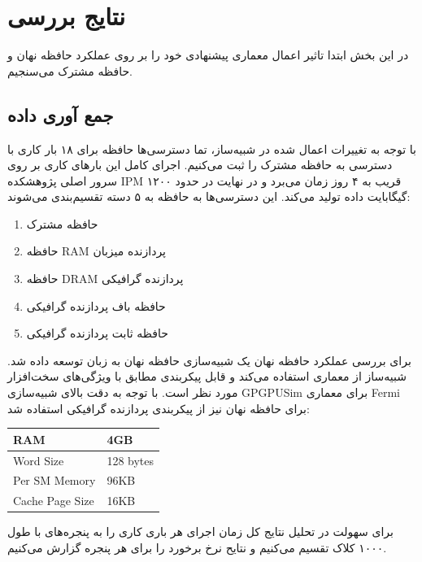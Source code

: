 \documentclass{thesis}
\begin{document}
\chapter{
نتایج بررسی
}

در این بخش ابتدا تاثیر اعمال معماری پیشنهادی خود را بر روی عملکرد حافظه نهان و
حافظه مشترک می‌سنجیم.

\section{
جمع آوری داده
}

با توجه به تغییرات اعمال شده در شبیه‌ساز، تما دسترسی‌ها حافظه برای ۱۸ بار کاری
با دسترسی به حافظه مشترک را ثبت می‌کنیم.  اجرای کامل این بارهای کاری بر روی
سرور اصلی 
پژوهشکده
IPM
قریب به ۴ روز زمان می‌برد و در نهایت در حدود
۱۲۰۰
گیگابایت داده تولید می‌کند.
این دسترسی‌ها به حافظه  به ۵ دسته تقسیم‌بندی می‌شوند:
\begin{enumerate}
\item
حافظه مشترک
\item
حافظه RAM
پردازنده میزبان
\item
حافظه
DRAM
پردازنده گرافیکی
\item
حافظه
باف
پردازنده گرافیکی
\item
حافظه ثابت
پردازنده گرافیکی
\end{enumerate}

برای بررسی عملکرد حافظه نهان یک شبیه‌سازی حافظه نهان به زبان 
توسعه داده شد. شبیه‌ساز از معماری
استفاده می‌کند و قابل پیکربندی مطابق با ویژگی‌های سخت‌افزار مورد نظر است. با
توجه به دقت بالای شبیه‌سازی
GPGPUSim
برای معماری
Fermi
برای حافظه نهان نیز از  پیکربندی پردازنده گرافیکی
استفاده شد:

\begin{latin}
\begin{center}
\begin{tabular}{|l|l|}
	\hline
	RAM & 4GB \\
	\hline
	Word Size & 128 bytes \\
	\hline
	Per SM Memory & 96KB \\
	\hline
	Cache Page Size & 16KB \\
	\hline
\end{tabular}	
\end{center}
\end{latin}

برای سهولت در تحلیل نتایج کل زمان اجرای هر باری کاری را به پنجره‌های با طول
۱۰۰۰ کلاک تقسیم می‌کنیم و نتایح نرخ برخورد را برای هر پنجره گزارش می‌کنیم.
\end{document}

